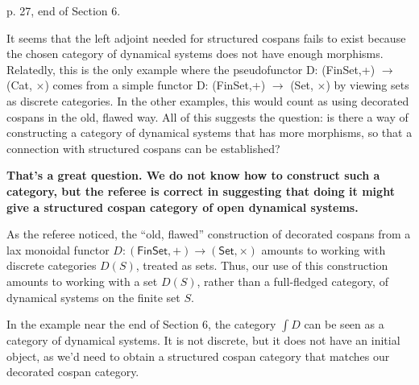 \documentclass[reqno]{amsart}
\def\chris{\color{purple} Christina: }
\def\john{\color{red} John: }
\def\kenny{\color{blue} Kenny: }
\begin{document}
\begin{enumerate}
{%

\iffalse
{\kenny I \emph{think} they are complaining that we use $f$ as a map of vertices and $g$ as a map of edges when we're talking about the functor $F \colon \mathsf{Set} \to \mathsf{Cat}$ on page 21, but we use $g$ as a map of vertices and $f$ as a map of edges in the two squares at the start of Section 6.1 on the previous page?}

{\john That sounds plausible.  Unless there's a damn good reason let's use $f$ as a map for vertices and $g$ as a map for edges, since ``vertices come 
before edges'' - morally the first are 0-cells, the second are 1-cells.}

{\chris I see. Fixed, and see above.}
\fi

\item p. 27, end of Section 6.

It seems that the left adjoint needed for structured cospans fails to exist because the chosen category of dynamical systems does not have enough 
morphisms. Relatedly, this is the only example where the pseudofunctor D: (FinSet,+) $\to$ (Cat, $\times$) comes from a simple functor D: (FinSet,+) 
$\to$ (Set, $\times$) by viewing sets as discrete categories. In the other examples, this would count as using decorated cospans in the old, flawed 
way. 
All of this suggests the question: is there a way of constructing a category of dynamical systems that has more morphisms, so that a connection with 
structured cospans can be established?

{\bf That's a great question.   We do not know how to construct such a category, but the referee
is correct in suggesting that doing it might give a structured cospan category of open dynamical
systems.    

As the referee noticed, the ``old, flawed'' construction of 
decorated cospans from a lax monoidal functor $D \colon (\mathsf{FinSet},+) \to 
(\mathsf{Set}, \times) $ amounts to working with discrete categories $D(S)$, treated
as sets.  Thus, our use of this construction amounts to working with a
set $D(S)$, rather than a full-fledged category, of dynamical systems on the finite set $S$.

In the example near the end of Section 6, the category $\int \! D$ can be seen as a category
of dynamical systems.   It is not discrete, but it does not have an initial object, as we'd
need to obtain a structured cospan
category that matches our decorated cospan category.   

}}
\end{enumerate}
\end{document}
